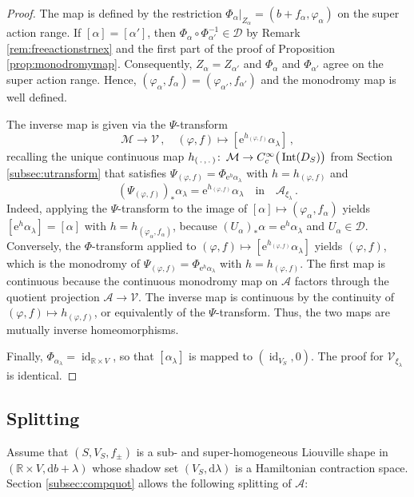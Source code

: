 \documentclass{amsart}
\theoremstyle{definition}
\def\co{\colon\thinspace}
\newcommand{\AAA}{\mathcal A}
\newcommand{\rmd}{\mathrm d}
\newcommand{\DD}{\mathcal D}
\newcommand{\rme}{\mathrm e}
\newcommand{\MM}{\mathcal M}
\newcommand{\R}{\mathbb R}
\newcommand{\VV}{\mathcal V}
\newcommand{\lra}{\longrightarrow}
\newcommand{\ra}{\rightarrow}
\DeclareMathOperator{\id}{\mathrm{id}}
\DeclareMathOperator{\Int}{\mathrm{Int}}
\begin{document}
\begin{proof}
The map is defined by the restriction
$\Phi_{\alpha}|_{Z_{\alpha}}=(b+f_{\alpha},\varphi_{\alpha})$
on the super action range.
If $[\alpha]=[\alpha']$, then
$\Phi_{\alpha}\circ\Phi_{\alpha'}^{-1}\in\DD$
by Remark \ref{rem:freeactionstrnex}
and the first part of the proof of
Proposition \ref{prop:monodromymap}.
Consequently,
$Z_{\alpha}=Z_{\alpha'}$ and
$\Phi_{\alpha}$ and $\Phi_{\alpha'}$
agree on the super action range.
Hence,
$(\varphi_{\alpha},f_{\alpha})=(\varphi_{\alpha'},f_{\alpha'})$
and the monodromy map is well defined.

The inverse map is given via the $\Psi$-transform
  \[
  \MM\lra\VV
  \,,
  \quad
  (\varphi,f)\longmapsto
  [\rme^{h_{(\varphi,f)}}\alpha_{\lambda}]
  \,,
  \]
recalling the unique continuous map
$h_{(\,.\,,\,.\,)}\co\MM\ra C_c^{\infty}\big(\Int(D_S)\big)$
from Section \ref{subsec:utransform}
that satisfies  
$\Psi_{(\varphi,f)}=\Phi_{\rme^h\alpha_{\lambda}}$
with $h=h_{(\varphi,f)}$
and 
\[
(\Psi_{(\varphi,f)})_*\alpha_{\lambda}
=\rme^{h_{(\varphi,f)}}\alpha_{\lambda}
\quad\text{in}\quad
\AAA_{\xi_{\lambda}}
\,.
\]
Indeed,
applying the $\Psi$-transform to the image of
$[\alpha]\mapsto(\varphi_{\alpha},f_{\alpha})$
yields $[\rme^h\alpha_{\lambda}]=[\alpha]$
with $h=h_{(\varphi_{\alpha},f_{\alpha})}$,
because $(U_{\alpha})_*\alpha=\rme^h\alpha_{\lambda}$
and $U_{\alpha}\in\DD$.
Conversely,
the $\Phi$-transform applied to
$(\varphi,f)\mapsto[\rme^{h_{(\varphi,f)}}\alpha_{\lambda}]$
yields $(\varphi,f)$,
which is the monodromy of
$\Psi_{(\varphi,f)}=\Phi_{\rme^h\alpha_{\lambda}}$
with $h=h_{(\varphi,f)}$.
The first map is continuous
because the continuous monodromy map on $\AAA$
factors through the quotient projection $\AAA\ra\VV$.
The inverse map is continuous
by the continuity of $(\varphi,f)\mapsto h_{(\varphi,f)}$,
or equivalently of the $\Psi$-transform.
Thus, the two maps are mutually inverse homeomorphisms.

Finally,
$\Phi_{\alpha_{\lambda}}=\id_{\R\times V}$,
so that $[\alpha_{\lambda}]$ is mapped to
$(\id_{V_S},0)$.
The proof for $\VV_{\xi_{\lambda}}$ is identical.
\end{proof}



\subsection{Splitting\label{subsec:splitting}}


Assume that $(S,V_S,f_{\pm})$
is a sub- and super-homogeneous Liouville shape
in $(\R\times V,\rmd b+\lambda)$
whose shadow set $(V_S,\rmd\lambda)$
is a Hamiltonian contraction space.
Section \ref{subsec:compquot}
allows the following splitting of $\AAA$:
\end{document}
